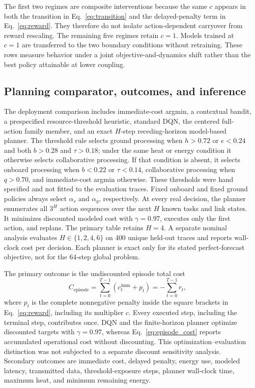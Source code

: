 \documentclass[11pt]{article}
\begin{document}
The first two regimes are composite interventions because the same $c$ appears in both the transition in Eq.~\eqref{eq:transition} and the delayed-penalty term in Eq.~\eqref{eq:reward}. They therefore do not isolate action-dependent carryover from reward rescaling. The remaining five regimes retain $c=1$. Models trained at $c=1$ are transferred to the two boundary conditions without retraining. These rows measure behavior under a joint objective-and-dynamics shift rather than the best policy attainable at lower coupling.

\subsection{Planning comparator, outcomes, and inference}

The deployment comparison includes immediate-cost argmin, a contextual bandit, a prespecified resource-threshold heuristic, standard DQN, the centered full-action family member, and an exact $H$-step receding-horizon model-based planner. The threshold rule selects ground processing when $h>0.72$ or $e<0.24$ and both $b>0.28$ and $\tau>0.18$; under the same heat or energy condition it otherwise selects collaborative processing. If that condition is absent, it selects onboard processing when $b<0.22$ or $\tau<0.14$, collaborative processing when $q>0.70$, and immediate-cost argmin otherwise. These thresholds were hand specified and not fitted to the evaluation traces. Fixed onboard and fixed ground policies always select $\alpha_s$ and $\alpha_g$, respectively. At every real decision, the planner enumerates all $3^H$ action sequences over the next $H$ known tasks and link states. It minimizes discounted modeled cost with $\gamma=0.97$, executes only the first action, and replans. The primary table retains $H=4$. A separate nominal analysis evaluates $H\in\{1,2,4,6\}$ on 400 unique held-out traces and reports wall-clock cost per decision. Each planner is exact only for its stated perfect-forecast objective, not for the 64-step global problem.

The primary outcome is the undiscounted episode total cost
\begin{equation}
C_{\mathrm{episode}}=\sum_{t=0}^{T-1}\left(c^{\mathrm{imm}}_t+p_t\right)=-\sum_{t=0}^{T-1}r_t,
\label{eq:episode_cost}
\end{equation}
where $p_t$ is the complete nonnegative penalty inside the square brackets in Eq.~\eqref{eq:reward}, including its multiplier $c$. Every executed step, including the terminal step, contributes once. DQN and the finite-horizon planner optimize discounted targets with $\gamma=0.97$, whereas Eq.~\eqref{eq:episode_cost} reports accumulated operational cost without discounting. This optimization--evaluation distinction was not subjected to a separate discount sensitivity analysis. Secondary outcomes are immediate cost, delayed penalty, energy use, modeled latency, transmitted data, threshold-exposure steps, planner wall-clock time, maximum heat, and minimum remaining energy.
\end{document}
